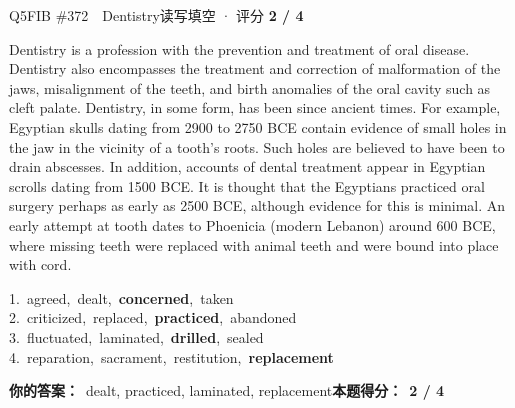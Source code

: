 \begin{qblock}{Q5\quad FIB \#372\ \ Dentistry}{读写填空 · 评分 \textcolor{cAccent}{\bfseries 2 / 4}}
\begin{promptbox}
Dentistry is a profession  with the prevention and treatment of oral disease. Dentistry also encompasses the treatment and correction of malformation of the jaws, misalignment of the teeth, and birth anomalies of the oral cavity such as cleft palate. Dentistry, in some form, has been  since ancient times. For example, Egyptian skulls dating from 2900 to 2750 BCE contain evidence of small holes in the jaw in the vicinity of a tooth's roots. Such holes are believed to have been  to drain abscesses. In addition, accounts of dental treatment appear in Egyptian scrolls dating from 1500 BCE. It is thought that the Egyptians practiced oral surgery perhaps as early as 2500 BCE, although evidence for this is minimal. An early attempt at tooth  dates to Phoenicia (modern Lebanon) around 600 BCE, where missing teeth were replaced with animal teeth and were bound into place with cord.
\end{promptbox}
{\small
1.\ agreed,\ dealt,\ \textbf{concerned},\ taken\\
2.\ criticized,\ replaced,\ \textbf{practiced},\ abandoned\\
3.\ fluctuated,\ laminated,\ \textbf{drilled},\ sealed\\
4.\ reparation,\ sacrament,\ restitution,\ \textbf{replacement}}
\par\smallskip
\textbf{你的答案：}\ {\color{cWrong}dealt}, practiced, {\color{cWrong}laminated}, replacement\qquad\textbf{本题得分：}\ {\color{cAccent}\bfseries 2 / 4}
\end{qblock}

